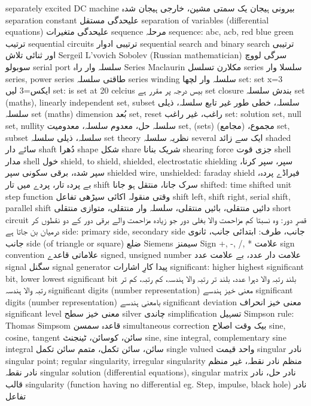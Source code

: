 separately excited DC machine	بیرونی ہیجان یک سمتی مشین، خارجی ہیجان شدہ
separation constant	علیحدگی مستقل
separation of variables (differential equations)	علیحدگی متغیرات
sequence	مرحلہ
sequence: abc, acb, red blue green	ترتیب
sequential circuits	ترتیبی ادوار
sequential search and binary search	ترتیبی اور ثنائی  تلاش
Sergeil L'vovich Sobolev (Russian mathematician)	سرگی لووچ سوبولو
serial port	سلسلہ وار راہ
Series Maclaurin	مکلارن تسلسل
series	سلسلا وار
series, power series	طاقتی سلسلہ
series winding	سلسلہ وار لچھا
set: set x=3	ایکس=3 لیں
set: is set at 20 celcius	بیس درجہ پر مقرر ہے
set closure	بندش سلسلہ
set (maths), linearly independent set, subset	سلسلہ، خطی طور غیر تابع سلسلہ، ذیلی سلسلہ
set (maths) dimension	بُعد
set, reset	راغب، غیر راغب
set: solution set, null set, nullity	سلسلہ حل، معدوم سلسلہ، معدومیت
set, (sets)	مجموع، (مجامع)
set, subset	سلسلہ، ذیلی سلسلہ
set theory	نظریہ سلسلہ
several	ایک سے زائد
shaded	سائے دار
shaft	دُھرا
shape	شکل
share	شریک بنانا
shearing force	جزی قوت
shell	مدار
shell	خول
shield, to shield, shielded, electrostatic shielding	سپر، سپر کرنا، سپر شدہ، برقی سکونی سپر
shielded wire, unshielded: faraday shield	فیراڈے پردہ، بے پردہ تار، پردے میں تار
shift	سرک جانا، منتقل ہو جانا
shifted: time shifted unit step function	وقتی منقولہ اکائی سیڑھی تفاعل
shift left, shift right, serial shift, parallel shift	دائیں منتقلی، بائیں منتقلی، سلسلہ وار منتقلی، متوازی منتقلی
short circuit	قصرِ دور: وہ نسبتا کم مزاحمت والا بغلی دور جو زیادہ مزاحمت والے برقی دور کے دو نقطوں کر درمیان بن جاتا ہے
side: primary side, secondary side	جانب، طرف: ابتدائی جانب، ثانوی جانب
side (of triangle or square)	ضلع
Siemens	سیمنز
Sign +, -, /, *	علامت
sign convention	علاماتی قاعدے
signed, unsigned number	علامت دار عدد، بے علامت عدد
signal	سگنل
signal generator	پیدا کارِ اشارات
significant: higher highest significant bit, lower lowest significant bit	بلند رتبہ والا دہرا عدد، بلند تر رتبہ والا ہندسہ، کم رتبہ، کم تر رتبہ والا ہندسہ
significant digits  (number representation)	معنی خیز ہندسے
significant digits  (number representation)	بامعنی ہندسے
significant deviation	معنی خیز انحراف
significant level	معنی خیز سطح
silver	چاندی
simplification	تسہیل
Simpson rule: Thomas Simpsom	قاعدہ سمسن
simultaneous correction	بیک وقت اصلاح
sine, cosine, tangent	سائن، کوسائن، ٹینجنٹ
sine, sine integral, complementary sine integral	سائن، سائن تکمل، متمم سائن تکمل
single valued	واحد قیمت
singular	نادر
singular point; regular singularity, irregular singularity	منظم نادر نقطہ، غیر منظم نادر نقطہ
singular solution (differential equations), singular matrix	نادر حل، نادر قالب
singularity (function having no differential  eg. Step, impulse,  black hole)	نادر تفاعل
